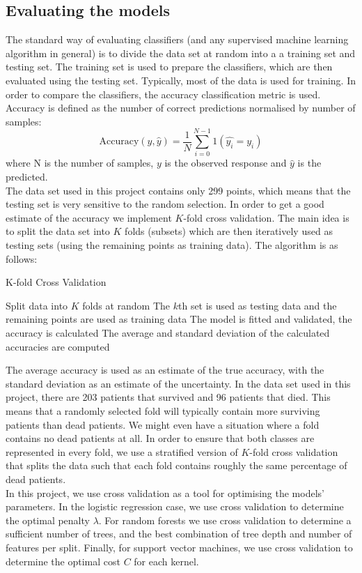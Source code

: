 \documentclass[notitlepage, reprint, nofootinbib]{revtex4-1}
\begin{document}
\subsection{Evaluating the models} \label{cv}
The standard way of evaluating classifiers (and any supervised machine learning algorithm in general) is to divide the data set at random into a a training set and testing set. The training set is used to prepare the classifiers, which are then evaluated using the testing set. Typically, most of the data is used for training. In order to compare the classifiers, the accuracy classification metric is used. Accuracy is defined as the number of correct predictions normalised by number of samples:
\begin{equation}\label{acc}\text{Accuracy}(y, \hat{y})=\frac{1}{N}\sum_{i=0}^{N-1}1(\hat{y_i}=y_i)\end{equation}
where N is the number of samples, $y$ is the observed response and $\hat{y}$ is the predicted. \\[2mm]
The data set used in this project contains only 299 points, which means that the testing set is very sensitive to the random selection. In order to get a good estimate of the accuracy we implement $K$-fold cross validation. The main idea is to split the data set into $K$ folds (subsets) which are then iteratively used as testing sets (using the remaining points as training data). The algorithm is as follows: 
\begin{algorithm}[H]
	\caption{K-fold Cross Validation}
	\begin{algorithmic}[1]
		\State Split data into $K$ folds at random  
			\State The $k$th set is used as testing data and the remaining points are used as training data
			\State The model is fitted and validated, the accuracy is calculated 
		\EndFor
		\State The average and standard deviation of the calculated accuracies are computed
	\end{algorithmic}
\end{algorithm}
The average accuracy is used as an estimate of the true accuracy, with the standard deviation as an estimate of the uncertainty. In the data set used in this project, there are 203 patients that survived and 96 patients that died. This means that a randomly selected fold will typically contain more surviving patients than dead patients. We might even have a situation where a fold contains no dead patients at all. In order to ensure that both classes are represented in every fold, we use a stratified version of $K$-fold cross validation that splits the data such that each fold contains roughly the same percentage of dead patients. \\[2mm]
In this project, we use cross validation as a tool for optimising the models' parameters. In the logistic regression case, we use cross validation to determine the optimal penalty $\lambda$. For random forests we use cross validation to determine a sufficient number of trees, and the best combination of tree depth and number of features per split. Finally, for support vector machines, we use cross validation to determine the optimal cost $C$ for each kernel. 
\end{document}
